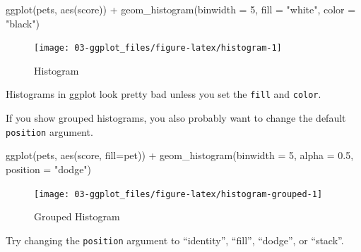 \documentclass[
  oneside]{book}
\newenvironment{Shaded}{\begin{snugshade}}{\end{snugshade}}
\newcommand{\AttributeTok}[1]{\textcolor[rgb]{0.77,0.63,0.00}{#1}}
\newcommand{\DecValTok}[1]{\textcolor[rgb]{0.00,0.00,0.81}{#1}}
\newcommand{\FloatTok}[1]{\textcolor[rgb]{0.00,0.00,0.81}{#1}}
\newcommand{\FunctionTok}[1]{\textcolor[rgb]{0.00,0.00,0.00}{#1}}
\newcommand{\NormalTok}[1]{#1}
\newcommand{\SpecialCharTok}[1]{\textcolor[rgb]{0.00,0.00,0.00}{#1}}
\newcommand{\StringTok}[1]{\textcolor[rgb]{0.31,0.60,0.02}{#1}}
\begin{document}
\begin{Shaded}
\begin{Highlighting}[]
\FunctionTok{ggplot}\NormalTok{(pets, }\FunctionTok{aes}\NormalTok{(score)) }\SpecialCharTok{+}
  \FunctionTok{geom\_histogram}\NormalTok{(}\AttributeTok{binwidth =} \DecValTok{5}\NormalTok{, }\AttributeTok{fill =} \StringTok{"white"}\NormalTok{, }\AttributeTok{color =} \StringTok{"black"}\NormalTok{)}
\end{Highlighting}
\end{Shaded}

\begin{figure}

{\centering \texttt{[image: 03-ggplot\_files/figure-latex/histogram-1]} 

}

\caption{Histogram}\label{fig:histogram}
\end{figure}

\begin{info}
Histograms in ggplot look pretty bad unless you set the \texttt{fill} and \texttt{color}.

\end{info}

If you show grouped histograms, you also probably want to change the default \texttt{position} argument.

\begin{Shaded}
\begin{Highlighting}[]
\FunctionTok{ggplot}\NormalTok{(pets, }\FunctionTok{aes}\NormalTok{(score, }\AttributeTok{fill=}\NormalTok{pet)) }\SpecialCharTok{+}
  \FunctionTok{geom\_histogram}\NormalTok{(}\AttributeTok{binwidth =} \DecValTok{5}\NormalTok{, }\AttributeTok{alpha =} \FloatTok{0.5}\NormalTok{, }
                 \AttributeTok{position =} \StringTok{"dodge"}\NormalTok{)}
\end{Highlighting}
\end{Shaded}

\begin{figure}

{\centering \texttt{[image: 03-ggplot\_files/figure-latex/histogram-grouped-1]} 

}

\caption{Grouped Histogram}\label{fig:histogram-grouped}
\end{figure}

\begin{try}
Try changing the \texttt{position} argument to ``identity'', ``fill'', ``dodge'', or ``stack''.

\end{try}
\end{document}
